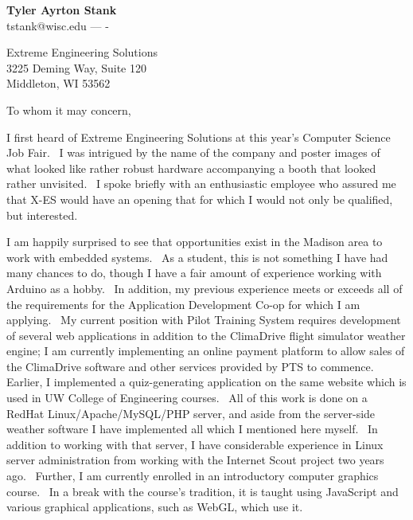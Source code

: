 \documentclass[12pt,letterpaper]{article}
\begin{document}
\thispagestyle{empty}

\begin{centering}
    {\large \textbf{Tyler Ayrton Stank}}\\
    tstank@wisc.edu ---  -\\
\end{centering}
Extreme Engineering Solutions\\
3225 Deming Way, Suite 120\\
Middleton, WI 53562


\par To whom it may concern,

\par I first heard of Extreme Engineering Solutions at this year's Computer Science Job Fair.~
    I was intrigued by the name of the company and poster images of what looked like rather robust hardware accompanying a booth that looked rather unvisited.~
    I spoke briefly with an enthusiastic employee who assured me that X-ES would have an opening that for which I would not only be qualified, but interested.~

\par I am happily surprised to see that opportunities exist in the Madison area to work with embedded systems.~
    As a student, this is not something I have had many chances to do, though I have a fair amount of experience working with Arduino as a hobby.~
    In addition, my previous experience meets or exceeds all of the requirements for the Application Development Co-op for which I am applying.~
    My current position with Pilot Training System requires development of several web applications in addition to the ClimaDrive flight simulator weather engine;
    I am currently implementing an online payment platform to allow sales of the ClimaDrive software and other services provided by PTS to commence.~
    Earlier, I implemented a quiz-generating application on the same website which is used in UW College of Engineering courses.~
    All of this work is done on a RedHat Linux/Apache/MySQL/PHP server, and aside from the server-side weather software I have implemented all which I mentioned here myself.~
    In addition to working with that server, I have considerable experience in Linux server administration from working with the Internet Scout project two years ago.~
    Further, I am currently enrolled in an introductory computer graphics course.~
    In a break with the course's tradition, it is taught using JavaScript and various graphical applications, such as WebGL, which use it.~
\end{document}
